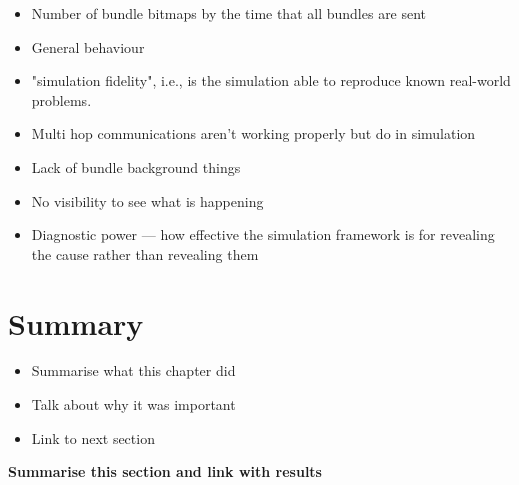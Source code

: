 \begin{itemize}
    \item Number of bundle bitmaps by the time that all bundles are sent
    \item General behaviour
    \item "simulation fidelity", i.e., is the simulation able to reproduce known real-world problems.
    \item Multi hop communications aren't working properly but do in simulation
    \item Lack of bundle background things
    \item No visibility to see what is happening
    \item Diagnostic power — how effective the simulation framework is for revealing the cause rather than revealing them 
\end{itemize}




\section{Summary}
\begin{itemize}
    \item Summarise what this chapter did
    \item Talk about why it was important
    \item Link to next section
\end{itemize}
\textbf{Summarise this section and link with results}